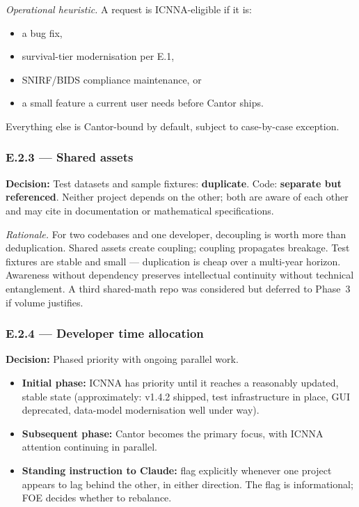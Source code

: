 \documentclass[11pt,a4paper]{article}
\begin{document}
\textit{Operational heuristic.} A request is ICNNA-eligible if it is:
\begin{itemize}[nosep]
    \item[(a)] a bug fix,
    \item[(b)] survival-tier modernisation per E.1,
    \item[(c)] SNIRF/BIDS compliance maintenance, or
    \item[(d)] a small feature a current user needs before Cantor ships.
\end{itemize}
Everything else is Cantor-bound by default, subject to case-by-case exception.

\subsubsection{E.2.3 --- Shared assets}

\textbf{Decision:} Test datasets and sample fixtures: \textbf{duplicate}. Code: \textbf{separate but referenced}. Neither project depends on the other; both are aware of each other and may cite in documentation or mathematical specifications.

\textit{Rationale.} For two codebases and one developer, decoupling is worth more than deduplication. Shared assets create coupling; coupling propagates breakage. Test fixtures are stable and small --- duplication is cheap over a multi-year horizon. Awareness without dependency preserves intellectual continuity without technical entanglement. A third shared-math repo was considered but deferred to Phase~3 if volume justifies.

\subsubsection{E.2.4 --- Developer time allocation}

\textbf{Decision:} Phased priority with ongoing parallel work.

\begin{itemize}
    \item \textbf{Initial phase:} ICNNA has priority until it reaches a reasonably updated, stable state (approximately: v1.4.2 shipped, test infrastructure in place, GUI deprecated, data-model modernisation well under way).
    \item \textbf{Subsequent phase:} Cantor becomes the primary focus, with ICNNA attention continuing in parallel.
    \item \textbf{Standing instruction to Claude:} flag explicitly whenever one project appears to lag behind the other, in either direction. The flag is informational; FOE decides whether to rebalance.
\end{itemize}
\end{document}
